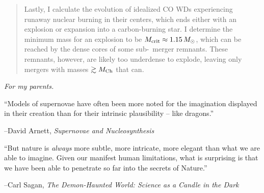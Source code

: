 \documentclass{ut-thesis}
\begin{document}
\begin{preliminary}
\begin{abstract}
Lastly, I calculate the evolution of idealized CO WDs experiencing runaway nuclear burning in their centers, which ends either with an explosion or expansion into a carbon-burning star.  I determine the minimum mass for an explosion to be $\Mcrit \approx 1.15\,\Msun$, which can be reached by the dense cores of some sub-\Mch\ merger remnants.  These remnants, however, are likely too underdense to explode, leaving only mergers with masses $\gtrsim\Mch$ that can.

\end{abstract}


\vspace*{\fill}
\begin{center}
\begin{minipage}[c]{3.75in}
\begin{center}
\textit{For my parents.}
\end{center}
\end{minipage}
\end{center}
\vspace*{\fill}
\clearpage

\vspace*{\fill}
\begin{center}
\begin{minipage}[c]{4.75in}
``Models of supernovae have often been more noted for the imagination displayed in their creation than for their intrinsic plausibility -- like dragons.''\vspace{2em}

\hfill --David Arnett, \emph{Supernovae and Nucleosynthesis}\vspace{4em}

``But nature is \textit{always} more subtle, more intricate, more elegant than what we are able to imagine.  Given our manifest human limitations, what is surprising is that we have been able to penetrate so far into the secrets of Nature.''\vspace{2em}

\hfill --Carl Sagan, \emph{The Demon-Haunted World: Science as a Candle in the Dark}

\end{minipage}
\end{center}
\vspace*{\fill}


\end{preliminary}
\end{document}
